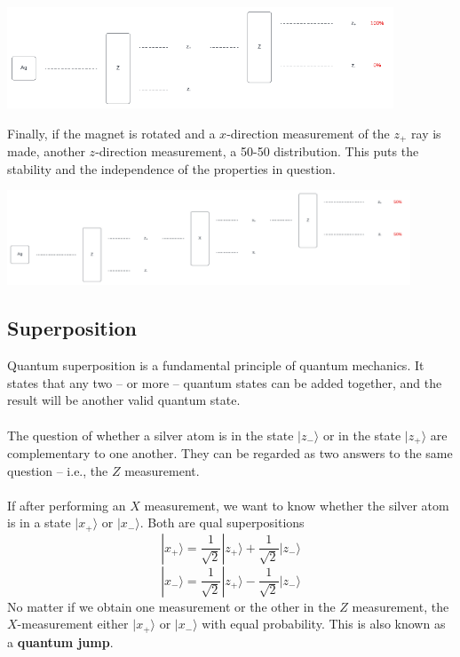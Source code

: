 \documentclass{article}
\begin{document}
\begin{center}
	\includegraphics[width=11.5cm]{assets/two_z_measurements.pdf}
\end{center}
Finally, if the magnet is rotated and a $x$-direction measurement of the $z_+$ ray is made, another $z$-direction measurement, a 50-50 distribution. This puts the stability and the independence of the properties in question.

\begin{center}
	\includegraphics[width=12cm]{assets/z_x_z_measurements.pdf}
\end{center}

\subsection{Superposition}
Quantum superposition is a fundamental principle of quantum mechanics. It states that any two -- or more -- quantum states can be added together, and the result will be another valid quantum state. \\ \\
The question of whether a silver atom is in the state $| z_- \rangle$ or in the state $| z_+ \rangle$ are complementary to one another. They can be regarded as two answers to the same question -- i.e., the $Z$ measurement. \\ \\
If after performing an $X$ measurement, we want to know whether the silver atom is in a state $| x_+ \rangle$ or $| x_- \rangle$. Both are qual superpositions
\[ |x_+\rangle = \frac{1}{\sqrt{2}}|z_+\rangle + \frac{1}{\sqrt{2}}|z_-\rangle \]
\[ |x_-\rangle = \frac{1}{\sqrt{2}}|z_+\rangle - \frac{1}{\sqrt{2}}|z_-\rangle \]
No matter if we obtain one measurement or the other in the $Z$ measurement, the $X$-measurement either $| x_+ \rangle$ or $| x_- \rangle$ with equal probability. This is also known as a \textbf{quantum jump}.
\end{document}
